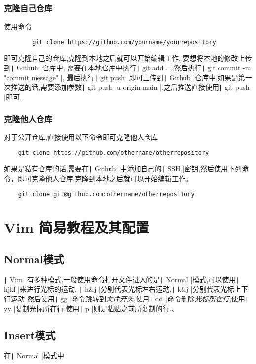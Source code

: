 \documentclass{article}
\newcommand\mintbash[1]{\texttt| #1 |}
\begin{document}
\begin{appendices}
    \subsubsection{克隆自己仓库}
    使用命令
    \begin{verbatim}
        git clone https://github.com/yourname/yourrepository
    \end{verbatim}
    即可克隆自己的仓库,克隆到本地之后就可以开始编辑工作,
    要想将本地的修改上传到\mintbash{Github}仓库中,
    需要在本地仓库中执行\mintbash{git add .},然后执行\mintbash{git commit -m "commit message"},
    最后执行\mintbash{git push}即可上传到\mintbash{Github}仓库中,如果是第一次推送的话,需要添加参数\mintbash{git push -u origin main},之后推送直接使用\mintbash{git push}即可.
    \subsubsection{克隆他人仓库}对于公开仓库,直接使用以下命令即可克隆他人仓库
    \begin{verbatim}
    git clone https://github.com/othername/otherrepository
\end{verbatim}
    如果是私有仓库的话,需要在\mintbash{Github}中添加自己的\mintbash{SSH}密钥,然后使用下列命令，即可克隆他人仓库,克隆到本地之后就可以开始编辑工作。
    \begin{verbatim}
    git clone git@github.com:othername/otherrepository
    \end{verbatim}
    \section{Vim 简易教程及其配置}
    \subsection{Normal模式}
    \mintbash{Vim}有多种模式,一般使用命令打开文件进入的是\mintbash{Normal}模式,可以使用\mintbash{hjkl}来进行光标的运动,
    \mintbash{h&j}分别代表光标左右运动,\mintbash{k&j}分别代表光标上下行运动
    然后使用\mintbash{gg}命令跳转到\emph{文件开头},使用\mintbash{dd}命令删除\emph{光标所在行},使用\mintbash{yy}复制光标所在行,使用\mintbash{p}则是粘贴之前所复制的行.、
\subsection{Insert模式}
在\mintbash{Normal}模式中
    
\end{appendices}
\end{document}
